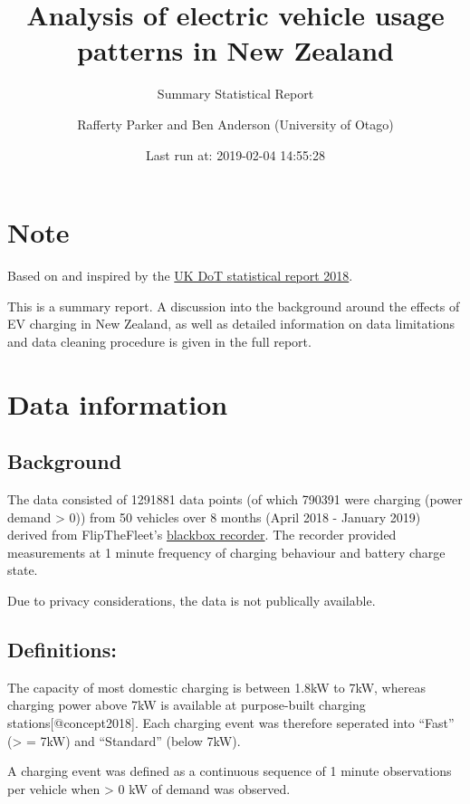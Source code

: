 \documentclass[]{article}
\title{Analysis of electric vehicle usage patterns in New Zealand}
\subtitle{Summary Statistical Report}
\author{Rafferty Parker and Ben Anderson (University of Otago)}
\date{Last run at: 2019-02-04 14:55:28}
\begin{document}
\maketitle

{
\setcounter{tocdepth}{2}
\tableofcontents
}
\section{Note}\label{note}

Based on and inspired by the
\href{https://assets.publishing.service.gov.uk/government/uploads/system/uploads/attachment_data/file/764270/electric-chargepoint-analysis-2017-domestics.pdf}{UK
DoT statistical report 2018}.

This is a summary report. A discussion into the background around the
effects of EV charging in New Zealand, as well as detailed information
on data limitations and data cleaning procedure is given in the full
report.

\section{Data information}\label{data}

\subsection{Background}\label{background}

The data consisted of 1291881 data points (of which 790391 were charging
(power demand \textgreater{} 0)) from 50 vehicles over 8 months (April
2018 - January 2019) derived from FlipTheFleet's
\href{https://flipthefleet.org/ev-black-box/}{blackbox recorder}. The
recorder provided measurements at 1 minute frequency of charging
behaviour and battery charge state.

Due to privacy considerations, the data is not publically available.

\subsection{Definitions:}\label{definitions}

The capacity of most domestic charging is between 1.8kW to 7kW, whereas
charging power above 7kW is available at purpose-built charging
stations{[}@concept2018{]}. Each charging event was therefore seperated
into ``Fast'' (\textgreater{} = 7kW) and ``Standard'' (below 7kW).

A charging event was defined as a continuous sequence of 1 minute
observations per vehicle when \textgreater{} 0 kW of demand was
observed.
\end{document}
